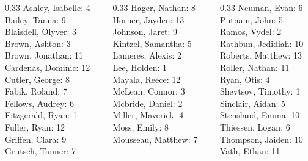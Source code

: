 \documentclass[10pt]{beamer}
\begin{document}
\begin{frame}
\begin{columns}
\begin{column}{0.33\textwidth}
Ashley, Isabelle: 4 \\ 
Bailey, Tanna: 9 \\ 
Blaisdell, Olyver: 3 \\ 
Brown, Ashton: 3 \\ 
Brown, Jonathan: 11 \\ 
Cardenas, Dominic: 12 \\ 
Cutler, George: 8 \\ 
Fabik, Roland: 7 \\ 
Fellows, Audrey: 6 \\ 
Fitzgerald, Ryan: 1 \\ 
Fuller, Ryan: 12 \\ 
Griffen, Clara: 9 \\ 
Grutsch, Tanner: 7 \\\end{column}
\begin{column}{0.33\textwidth}
Hager, Nathan: 8 \\ 
Horner, Jayden: 13 \\ 
Johnson, Jaret: 9 \\ 
Kintzel, Samantha: 5 \\ 
Lameres, Alexis: 2 \\ 
Lee, Holden: 1 \\ 
Mayala, Reece: 12 \\ 
McLean, Connor: 3 \\ 
Mcbride, Daniel: 2 \\ 
Miller, Maverick: 4 \\ 
Moss, Emily: 8 \\ 
Mousseau, Matthew: 7 \\\end{column}
\begin{column}{0.33\textwidth}
Neuman, Evan: 6 \\ 
Putnam, John: 5 \\ 
Ramos, Vydel: 2 \\ 
Rathbun, Jedidiah: 10 \\ 
Roberts, Matthew: 13 \\ 
Roller, Nathan: 11 \\ 
Ryan, Otis: 4 \\ 
Shevtsov, Timothy: 1 \\ 
Sinclair, Aidan: 5 \\ 
Stensland, Emma: 10 \\ 
Thiessen, Logan: 6 \\ 
Thompson, Jaiden: 10 \\ 
Vath, Ethan: 11 \\\end{column}
\end{columns}
\end{frame}
\end{document}
